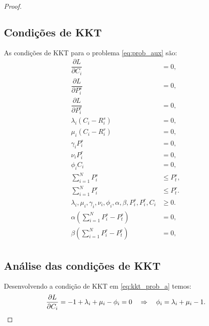 \begin{proof}
    \subsection{Condições de KKT}

    As condições de \ac{KKT} para o problema \eqref{eq:prob_aux} são:
    \begin{subequations}\label{eq:kkt_prob}
            \begin{align}
                    \dfrac{\partial L}{\partial C_i} &= 0, \label{eq:kkt_prob_a}\\
                    \dfrac{\partial L}{\partial P_i^s} &= 0, \label{eq:kkt_prob_b}\\
                    \dfrac{\partial L}{\partial P_i^r} &= 0, \label{eq:kkt_prob_c}\\
                    \lambda_i(C_i - R_i^s) &= 0, \label{eq:kkt_prob_d}\\
                    \mu_i(C_i - R_i^r) &= 0, \label{eq:kkt_prob_e}\\
                    \gamma_i P_i^s &= 0, \label{eq:kkt_prob_f}\\
                    \nu_i P_i^r &= 0, \label{eq:kkt_prob_g}\\
                    \phi_i C_i &= 0, \label{eq:kkt_prob_h} \\
                    \sum_{i=1}^N P_i^s &\leq P_{t}^s, \label{eq:kkt_prob_i}\\
                    \sum_{i=1}^N P_i^r &\leq P_{t}^r. \label{eq:kkt_prob_j}\\
                    \lambda_i,\mu_i,\gamma_i,\nu_i,\phi_i,\alpha,\beta,P_i^s,P_i^r,C_i & \geq 0. \label{eq:kkt_prob_k}\\
                    \alpha\left(\sum_{i=1}^N P_i^s - P_{t}^s\right) &= 0, \label{eq:kkt_prob_l}\\
                    \beta\left(\sum_{i=1}^N P_i^r - P_{t}^r\right) &= 0, \label{eq:kkt_prob_m}\\
            \end{align}
    \end{subequations}

    \subsection{Análise das condições de KKT}

    Desenvolvendo a condição de \ac{KKT} em \eqref{eq:kkt_prob_a} temos:
    \begin{equation}\label{eq:phi}
    \dfrac{\partial L}{\partial C_i} = -1 + \lambda_i + \mu_i - \phi_i = 0 \quad \Rightarrow \quad \phi_i = \lambda_i + \mu_i - 1.\\
    \end{equation}


\end{proof}
